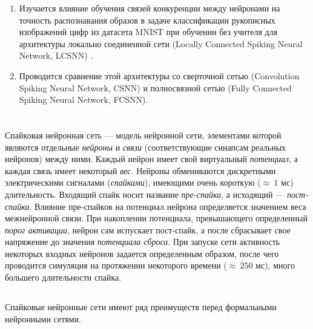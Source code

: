 \documentclass[a4paper]{article}
\begin{document}
\begin{enumerate}
\item Изучается влияние обучения связей конкуренции \cite{MaxActiv1, MaxActiv2, hardware_survey} между нейронами на точность распознавания образов в задаче классификации рукописных изображений цифр из датасета MNIST \cite{MNIST} при обучении без учителя для архитектуры локально соединенной сети (Locally Connected Spiking Neural Network, LCSNN) \cite{saunders2019locally}.
 
\item Проводится сравнение этой архитектуры со сверточной сетью (Convolution Spiking Neural Network, CSNN) и полносвязной сетью (Fully Connected Spiking Neural Network, FCSNN).

\end{enumerate}

\clearpage 

\section{}
Спайковая нейронная сеть --- модель нейронной сети, элементами которой являются  отдельные \textit{нейроны} и \textit{связи} (соответствующие синапсам реальных нейронов) между ними. Каждый нейрон имеет свой виртуальный \textit{потенциал}, а каждая связь имеет некоторый \textit{вес}. Нейроны обмениваются дискретными электрическими сигналами (\textit{спайками}), имеющими очень короткую ($ \approx ~1$ мс) длительность. Входящий спайк носит название \textit{пре-спайка}, а исходящий --- \textit{пост-спайка}.  Влияние пре-спайков на потенциал нейрона определяется значением веса межнейронной связи. При накоплении потенциала, превышающего определенный \textit{порог активации}, нейрон сам испускает пост-спайк, а после сбрасывает свое напряжение до значения \textit{потенциала сброса}. При запуске сети активность некоторых входных нейронов задается определенным образом, после чего проводится симуляция на протяжении некоторого времени ($\approx ~250$ мс), много большего длительности спайка.

\subsection{}
Спайковые нейронные сети имеют ряд преимуществ перед формальными нейронными сетями.
\end{document}
